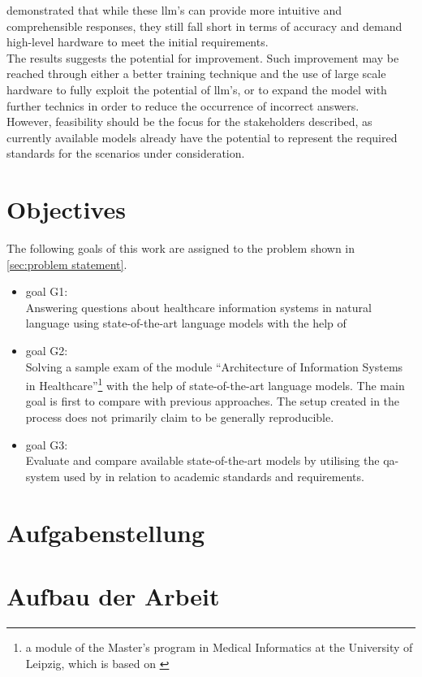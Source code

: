 \citet{Paul_Keller} demonstrated that while these \ac{llm}'s can provide more intuitive and comprehensible responses, they still fall short in terms of accuracy and demand high-level hardware to meet the initial requirements.\\ 
%
The results suggests the potential for improvement. 
Such improvement may be reached through either a better training technique and the use of large scale hardware to fully exploit the potential of \ac{llm}'s, or to expand the model with further technics in order to reduce the occurrence of incorrect answers.\\
%
However, feasibility should be the focus for the stakeholders described, as currently available models already have the potential to represent the required standards for the scenarios under consideration. 

\section{Objectives}\label{sec:objectives}
The following goals of this work are assigned to the problem shown in \cref{sec:problem statement}.
\begin{itemize}
  \item goal G1:\\ 
    Answering questions about healthcare information systems in natural language using state-of-the-art language models with the help of \citet{bb2} 
  \item goal G2:\\
   Solving a sample exam of the module \enquote{Architecture of Information Systems in Healthcare}\footnote{\raggedright{}a module of the Master's program in Medical Informatics at the University of Leipzig, which is based on \citet{bb}} with the help of state-of-the-art language models.\@
   The main goal is first to compare with previous approaches. 
   The setup created in the process does not primarily claim to be generally reproducible.
   \item goal G3:\\ 
    Evaluate and compare available state-of-the-art models by utilising the \ac{qa}-system used by \citet{Paul_Keller} in relation to academic standards and requirements.
\end{itemize}
\section{Aufgabenstellung}



\section{Aufbau der Arbeit}
